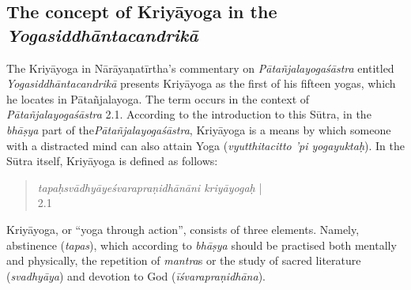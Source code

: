 %
%
%
%
%
%
\subsection{The concept of Kriyāyoga in the \textit{Yogasiddhāntacandrikā}}

The Kriyāyoga in Nārāyaṇatīrtha's commentary on \textit{Pātañjalayogaśāstra} entitled \textit{Yogasiddhāntacandrikā} presents Kriyāyoga as the first of his fifteen yogas, which he locates in Pātañjalayoga. The term occurs in the context of \textit{Pātañjalayogaśāstra} 2.1. According to the introduction to this Sūtra, in the \textit{bhāṣya} part of the\textit{Pātañjalayogaśāstra}, Kriyāyoga is a means by which someone with a distracted mind can also attain Yoga (\textit{vyutthitacitto 'pi yogayuktaḥ}). In the Sūtra itself, Kriyāyoga is defined as follows:
\begin{quote}  
  \textit{tapaḥsvādhyāyeśvarapraṇidhānāni kriyāyogaḥ} |\\
   2.1  \\
\end{quote}

Kriyāyoga, or ``yoga through action'', consists of three elements. Namely, abstinence (\textit{tapas}), which according to \textit{bhāṣya} should be practised both mentally and physically, the repetition of \textit{mantra}s or the study of sacred literature (\textit{svadhyāya}) and devotion to God (\textit{īśvarapraṇidhāna}).


